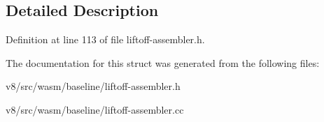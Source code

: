 \subsection{Detailed Description}


Definition at line 113 of file liftoff-\/assembler.\+h.



The documentation for this struct was generated from the following files\+:\begin{DoxyCompactItemize}
\item 
v8/src/wasm/baseline/liftoff-\/assembler.\+h\item 
v8/src/wasm/baseline/liftoff-\/assembler.\+cc\end{DoxyCompactItemize}
